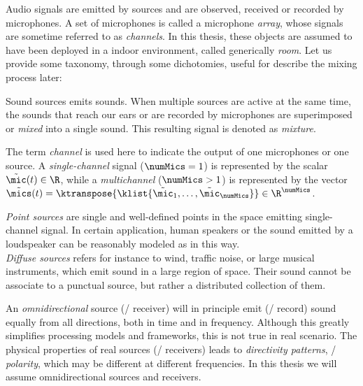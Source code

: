 \mynewline
Audio signals are emitted by sources and are observed, received or recorded by microphones.
A set of microphones is called a microphone \textit{array}, whose signals are sometime referred to as \textit{channels}.
In this thesis, these objects are assumed to have been deployed in a indoor environment, called generically \textit{room}.
Let us provide some taxonomy, through some dichotomies, useful for describe the mixing process later:

Sound sources emits sounds.
When multiple sources are active at the same time, the sounds that reach our ears or are recorded by microphones are superimposed or \textit{mixed} into a single sound.
This resulting signal is denoted as \textit{mixture}.

The term \textit{channel}
is used here to indicate the output of one microphones or one source.
A \textit{single-channel} signal ($\numMics = 1$) is represented by the scalar $\tilde{\mic}(t) \in \R$,
while a \textit{multichannel} ($\numMics >   1$) is represented by the vector $\tilde{\mics}(t) = \ktranspose{\klist{\tilde{\mic}_1, \dots, \tilde{\mic}_{\numMics}}} \in \R^{\numMics}$.

\textit{Point sources} are single and well-defined points in the space emitting single-channel signal.
In certain application, human speakers or the sound emitted by a loudspeaker can be reasonably modeled as in this way.
\\\textit{Diffuse sources} refers for instance to wind, traffic noise, or large musical instruments, which emit sound in a large region of space.
Their sound cannot be associate to a punctual source, but rather a distributed collection of them.

An \textit{omnidirectional} source (\resp/ receiver) will in principle emit (\resp/ record) sound equally from all directions,
both in time and in frequency.
Although this greatly simplifies processing models and frameworks, this is not true in real scenario.
The physical properties of real sources (\resp/ receivers) leads to \textit{directivity patterns}, \aka/ \textit{polarity}, which may
be different at different frequencies.
In this thesis we will assume omnidirectional sources and receivers.

